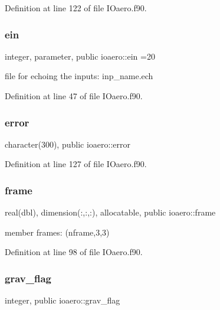 Definition at line 122 of file I\+Oaero.\+f90.

\mbox{\label{namespaceioaero_a6a4b9f5362e2eee64e5777786065f563}} 
\subsubsection{\texorpdfstring{ein}{ein}}
{\footnotesize\ttfamily integer, parameter, public ioaero\+::ein =20}



file for echoing the inputs\+: inp\+\_\+name.\+ech 



Definition at line 47 of file I\+Oaero.\+f90.

\mbox{\label{namespaceioaero_aebd85ae2a176f49a7213d8ed7b68f887}} 
\subsubsection{\texorpdfstring{error}{error}}
{\footnotesize\ttfamily character(300), public ioaero\+::error}



Definition at line 127 of file I\+Oaero.\+f90.

\mbox{\label{namespaceioaero_a26d467b1adbb838f4b1ba3dd4ee1ea0d}} 
\subsubsection{\texorpdfstring{frame}{frame}}
{\footnotesize\ttfamily real(dbl), dimension(\+:,\+:,\+:), allocatable, public ioaero\+::frame}



member frames\+: (nframe,3,3) 



Definition at line 98 of file I\+Oaero.\+f90.

\mbox{\label{namespaceioaero_a831fe87d45ef05e3e29a8c4c2fc88c8f}} 
\subsubsection{\texorpdfstring{grav\+\_\+flag}{grav\_flag}}
{\footnotesize\ttfamily integer, public ioaero\+::grav\+\_\+flag}


